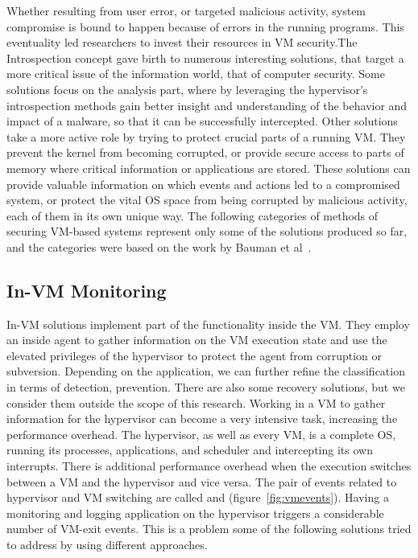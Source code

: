 \par Whether resulting from user error, or targeted malicious activity, system compromise is bound to happen because of errors in the running programs. This eventuality led researchers to invest their resources in \ac{VM} security.The Introspection concept gave birth to numerous interesting solutions, that target a more critical issue of the information world, that of computer security. Some solutions focus on the analysis part, where by leveraging the hypervisor's introspection methods gain better insight and understanding of the behavior and impact of a malware, so that it can be successfully intercepted. Other solutions take a more active role by trying to protect crucial parts of a running \ac{VM}. They prevent the kernel from becoming corrupted, or provide secure access to parts of memory where critical information or applications are stored. 
These solutions can provide valuable information on which events and actions led to a compromised system, or protect the vital \ac{OS} space from being corrupted by malicious activity, each of them in its own unique way. 
The following categories of methods of securing \ac{VM}-based systems represent only some of the solutions produced so far, and the categories were based on the work by Bauman et al~\cite{bauman2015survey}.

\subsection{In-\ac{VM} Monitoring}\label{sub:invm}
In-\ac{VM} solutions implement part of the functionality inside the \ac{VM}. They employ an inside agent to gather information on the \ac{VM} execution state and use the elevated privileges of the hypervisor to protect the agent from corruption or subversion. Depending on the application, we can further refine the classification in terms of detection, prevention. There are also some recovery solutions, but we consider them outside the scope of this research. Working in a \ac{VM} to gather information for the hypervisor can become a very intensive task, increasing the performance overhead. The hypervisor, as well as every \ac{VM}, is a complete \ac{OS}, running its processes, applications, and scheduler and intercepting its own interrupts. There is additional performance overhead when the execution switches between a \ac{VM} and the hypervisor and vice versa. The pair of events related to hypervisor and \ac{VM} switching are called  and  (figure~\ref{fig:vmevents}). Having a monitoring and logging application on the hypervisor triggers a considerable number of VM-exit events. This is a problem some of the following solutions tried to address by using different approaches.


